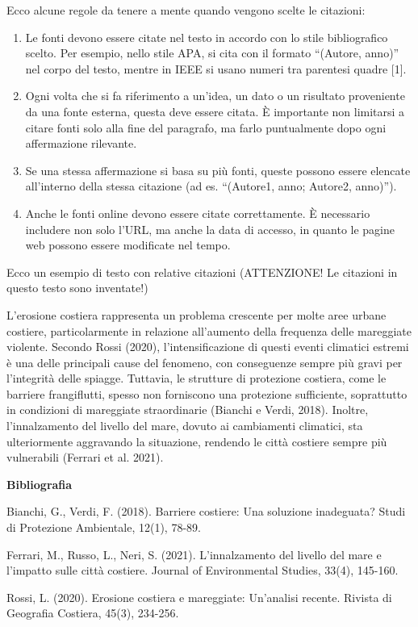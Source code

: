 \documentclass[9pt,a4paper,twoside]{rho-class/rho}
\begin{document}
Ecco alcune regole da tenere a mente quando vengono scelte le citazioni:

\begin{enumerate}
	\item Le fonti devono essere citate nel testo in accordo con lo stile bibliografico scelto. Per esempio, nello stile APA, si cita con il formato “(Autore, anno)” nel corpo del testo, mentre in IEEE si usano numeri tra parentesi quadre [1].
	\item Ogni volta che si fa riferimento a un’idea, un dato o un risultato proveniente da una fonte esterna, questa deve essere citata. È importante non limitarsi a citare fonti solo alla fine del paragrafo, ma farlo puntualmente dopo ogni affermazione rilevante.
	\item Se una stessa affermazione si basa su più fonti, queste possono essere elencate all’interno della stessa citazione (ad es. “(Autore1, anno; Autore2, anno)”).
	\item Anche le fonti online devono essere citate correttamente. È necessario includere non solo l’URL, ma anche la data di accesso, in quanto le pagine web possono essere modificate nel tempo.
\end{enumerate}

Ecco un esempio di testo con relative citazioni (ATTENZIONE! Le citazioni in questo testo sono inventate!)

\begin{info}
L’erosione costiera rappresenta un problema crescente per molte aree urbane costiere, particolarmente in relazione all’aumento della frequenza delle mareggiate violente. Secondo Rossi (2020), l’intensificazione di questi eventi climatici estremi è una delle principali cause del fenomeno, con conseguenze sempre più gravi per l’integrità delle spiagge. Tuttavia, le strutture di protezione costiera, come le barriere frangiflutti, spesso non forniscono una protezione sufficiente, soprattutto in condizioni di mareggiate straordinarie (Bianchi e Verdi, 2018). Inoltre, l’innalzamento del livello del mare, dovuto ai cambiamenti climatici, sta ulteriormente aggravando la situazione, rendendo le città costiere sempre più vulnerabili (Ferrari et al. 2021).

\textbf{Bibliografia}

Bianchi, G., Verdi, F. (2018). Barriere costiere: Una soluzione inadeguata? Studi di Protezione Ambientale, 12(1), 78-89.
 
Ferrari, M., Russo, L., Neri, S. (2021). L’innalzamento del livello del mare e l’impatto sulle città costiere. Journal of Environmental Studies, 33(4), 145-160.

 Rossi, L. (2020). Erosione costiera e mareggiate: Un’analisi recente. Rivista di Geografia Costiera, 45(3), 234-256.
\end{info}
\end{document}
